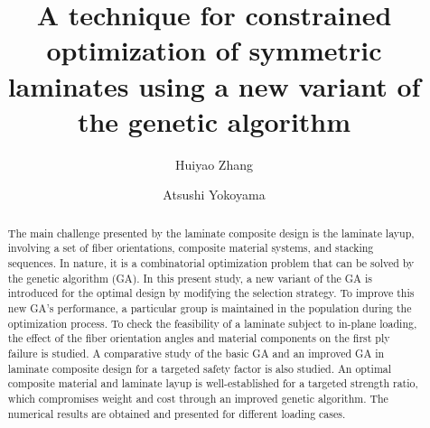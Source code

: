 \documentclass[USenglish,twocolumn]{article}
\begin{document}

\author[1]{Huiyao Zhang}
\author*[2]{Atsushi Yokoyama}



  \title{\huge A technique for constrained optimization of symmetric laminates using a new variant of the genetic algorithm}



  \begin{abstract}
{The main challenge presented by the laminate composite design is the laminate layup, involving a
set of fiber orientations, composite material systems, and stacking sequences. In nature, it is a
combinatorial optimization problem that can be solved by the genetic algorithm (GA). In this present
study, a new variant of the GA is introduced for the optimal design by modifying the selection
strategy. To improve this new GA's performance, a particular group is maintained in the population
during the optimization process. To check the feasibility of a laminate subject to in-plane
loading, the effect of the fiber orientation angles and material components on the first ply failure is
studied. A comparative study of the basic GA and an improved GA in laminate composite design for a
targeted safety factor is also studied. An optimal composite material and laminate layup is
well-established for a targeted strength ratio, which compromises weight and cost through an improved
genetic algorithm. The numerical results are obtained and presented for different loading cases. }
\end{abstract}



\maketitle
\end{document}

